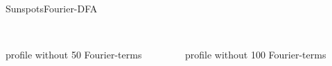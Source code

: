 \documentclass{beamer}
\begin{document}
\begin{frame}{Sunspots}{Fourier-DFA}
	\begin{columns}
		\begin{column}{.47\textwidth}
				\centering
				\scalebox{.6}{}
				\\\vspace{1ex}
				\tiny{profile without 50 Fourier-terms}
		\end{column}
		\hfill
		\begin{column}{.47\textwidth}
				\centering
				\scalebox{.6}{}
				\\\vspace{1ex}
				\tiny{profile without 100 Fourier-terms}
		\end{column}
	\end{columns}
	\vfill
		\centering
		\scalebox{.5}{}
\end{frame}
\end{document}

